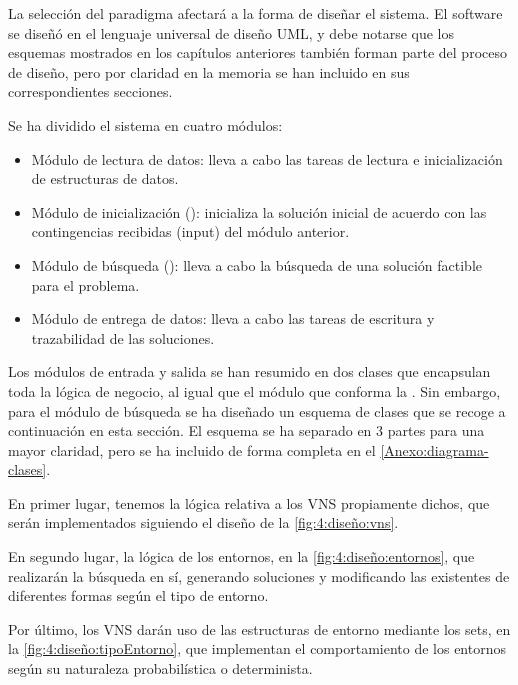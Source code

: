 La selección del paradigma afectará a la forma de diseñar el sistema. El software se diseñó en el lenguaje universal de diseño UML, y debe notarse que los esquemas mostrados en los capítulos anteriores también forman parte del proceso de diseño, pero por claridad en la memoria se han incluido en sus correspondientes secciones.

Se ha dividido el sistema en cuatro módulos:
\begin{itemize}
	\item Módulo de lectura de datos: lleva a cabo las tareas de lectura e inicialización de estructuras de datos.
	\item Módulo de inicialización (\faseuno{}): inicializa la solución inicial de acuerdo con las contingencias recibidas (input) del módulo anterior.
	\item Módulo de búsqueda (\fasedos{}): lleva a cabo la búsqueda de una solución factible para el problema.
	\item Módulo de entrega de datos: lleva a cabo las tareas de escritura y trazabilidad de las soluciones.
\end{itemize}

Los módulos de entrada y salida se han resumido en dos clases que encapsulan toda la lógica de negocio, al igual que el módulo que conforma la \faseuno{}. Sin embargo, para el módulo de búsqueda se ha diseñado un esquema de clases que se recoge a continuación en esta sección. El esquema se ha separado en 3 partes para una mayor claridad, pero se ha incluido de forma completa en el \autoref{Anexo:diagrama-clases}. 

En primer lugar, tenemos la lógica relativa a los VNS propiamente dichos, que serán implementados siguiendo el diseño de la \autoref{fig:4:diseño:vns}.

En segundo lugar, la lógica de los entornos, en la \autoref{fig:4:diseño:entornos}, que realizarán la búsqueda en sí, generando soluciones y modificando las existentes de diferentes formas según el tipo de entorno.

%
%
%
Por último, los VNS darán uso de las estructuras de entorno mediante los sets, en la \autoref{fig:4:diseño:tipoEntorno}, que implementan el comportamiento de los entornos según su naturaleza probabilística o determinista.


